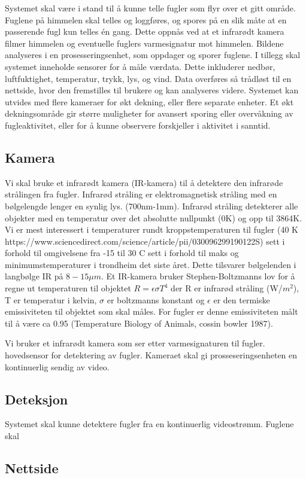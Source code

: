 Systemet skal være i stand til å kunne telle fugler som flyr over et gitt område. Fuglene på himmelen skal telles og loggføres, og spores på en slik måte at en passerende fugl kun telles én gang. Dette oppnås ved at et infrarødt kamera filmer himmelen og eventuelle fuglers varmesignatur mot himmelen. Bildene analyseres i en prosesseringsenhet, som oppdager og sporer fuglene. I tillegg skal systemet inneholde sensorer for å måle værdata. Dette inkluderer nedbør, luftfuktighet, temperatur, trykk, lys, og vind. Data overføres så trådløst til en nettside, hvor den fremstilles til brukere og kan analyseres videre. Systemet kan utvides med flere kameraer for økt dekning, eller flere separate enheter. Et økt dekningsområde gir større muligheter for avansert sporing eller overvåkning av fugleaktivitet, eller for å kunne observere forskjeller i aktivitet i sanntid.




\subsection{Kamera}

Vi skal bruke et infrarødt kamera (IR-kamera) til å detektere den infrarøde strålingen fra fugler. Infrarød stråling er elektromagnetisk stråling med en bølgelengde lenger en synlig lys. (700nm-1mm). Infrarød stråling detekterer alle objekter med en temperatur over det absolutte nullpunkt (0K) og opp til 3864K. Vi er mest interessert i temperaturer rundt kroppstemperaturen til fugler (40 K https://www.sciencedirect.com/science/article/pii/030096299190122S) sett i forhold til omgivelsene fra -15 til 30 C sett i forhold til maks og minimumstemperaturer i trondheim det siste året. Dette tilsvarer bølgelenden i langbølge IR på $8-15\mu m$. Et IR-kamera bruker Stephen-Boltzmanns lov for å regne ut temperaturen til objektet $R=\epsilon \sigma T^4$ der R er infrarød stråling (W/$m^2$), T er temperatur i kelvin, $\sigma$ er boltzmanns konstant og $\epsilon$ er den termiske emissiviteten til objektet som skal måles. For fugler er denne emissiviteten målt til å være ca 0.95 (Temperature Biology
of Animals, cossin bowler 1987). 


Vi bruker et infrarødt kamera som ser etter varmesignaturen til fugler. hovedsensor for detektering av fugler. Kameraet skal gi prosseseringsenheten en kontinuerlig sendig av video.


\subsection{Deteksjon}
Systemet skal kunne detektere fugler fra en kontinuerlig videostrømm. Fuglene skal 



\subsection{Nettside}


